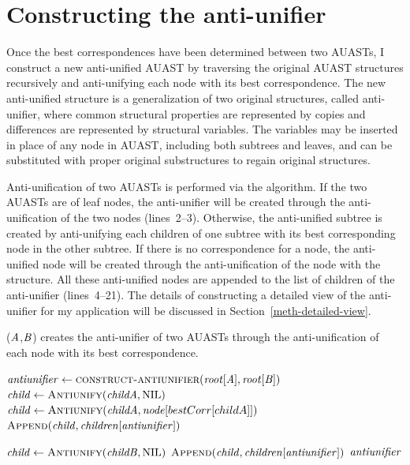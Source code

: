 \section{Constructing the anti-unifier} \label{meth-antiUnifier}
Once the best correspondences have been determined between two AUASTs, I construct a new anti-unified AUAST by traversing the original AUAST structures recursively and anti-unifying each node with its best correspondence. The new anti-unified structure is a generalization of two original structures, called anti-unifier, where common structural properties are represented by copies and differences are represented by structural variables. The variables may be inserted in place of any node in AUAST, including both subtrees and leaves, and can be substituted with proper original substructures to regain original structures.



Anti-unification of two AUASTs is performed via the  algorithm. If the two AUASTs are of leaf nodes, the anti-unifier will be created through the anti-unification of the two nodes (lines~2--3). Otherwise, the anti-unified subtree is created by anti-unifying each children of one subtree with its best corresponding node in the other subtree. If there is no correspondence for a node, the anti-unified node will be created through the anti-unification of the node with the \NIL{} structure. All these anti-unified nodes are appended to the list of children of the anti-unifier (lines~4--21). The details of constructing a detailed view of the anti-unifier for my application will be discussed in Section~\ref{meth-detailed-view}.


\begin{algorithm}
 \caption{($\mathit{A}$,$\mathit{B}$) creates the anti-unifier of two AUASTs through the anti-unification of each node with its best correspondence.}
  \label{AntiUnify}
  \begin{algorithmic}[1]
\AntiUnify
{}
  \State $\mathit{antiunifier} \gets   \textsc{construct-antiunifier}(\mathit{root}[\mathit{A}],\mathit{root}[\mathit{B}])$
  \State $\mathit{child} \gets   \textsc{Antiunify}(\mathit{childA},\textrm{NIL})$
\Else	
 \State $\mathit{child} \gets   \textsc{Antiunify}(\mathit{childA},\mathit{node}[bestCorr[childA]])$
\EndIf
\State $\textsc{Append}(\mathit{child},\mathit{children[antiunifier]})$
\EndFor
\EndIf

  \State $\mathit{child} \gets   \textsc{Antiunify}(\mathit{childB},\textrm{NIL})$
\EndIf
\State $\textsc{Append}(\mathit{child},\mathit{children[antiunifier]})$
\EndFor
 \EndIf
\Return $\mathit{antiunifier}$
\end{algorithmic}
\end{algorithm}




